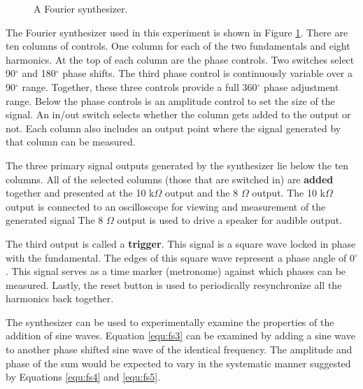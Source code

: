 \begin{figure}
\caption{A Fourier synthesizer.}
\label{fig:fs4}
\end{figure}

The Fourier synthesizer used in this experiment is shown in Figure \ref{fig:fs4}. There are ten columns of controls. One column for each of the two fundamentals and eight harmonics. At the top of each column are the phase controls. Two switches select 90$^{\circ}$ and 180$^{\circ}$ phase shifts. The third phase control is continuously variable over a 90$^{\circ}$ range. Together, these three controls provide a full 360$^{\circ}$ phase adjustment range. Below the phase controls is an amplitude control to set the size of the signal. An in/out switch selects whether the column gets added to the output or not. Each column also includes an output point where the signal generated by that column can be measured.

The three primary signal outputs generated by the synthesizer lie below the ten columns. All of the selected columns (those that are switched in) are {\bf added} together and presented at the 10 k$\Omega$ output and the 8 $\Omega$ output. The 10 k$\Omega$ output is connected to an oscilloscope for viewing and measurement of the generated signal  The 8 $\Omega$ output is used to drive a speaker for audible output.

The third output is called a {\bf trigger}. This signal is a square wave locked in phase with the fundamental. The edges of this square wave represent a phase angle of 0$^{\circ}$. This signal serves as a time marker (metronome) against which phases can be measured. Lastly, the reset button is used to periodically resynchronize all the harmonics back together.

The synthesizer can be used to experimentally examine the properties of the addition of sine waves. Equation \ref{equ:fs3} can be examined by adding a sine wave to another phase shifted sine wave of the identical frequency. The amplitude and phase of the sum would be expected to vary in the systematic manner suggested by Equations \ref{equ:fs4} and \ref{equ:fs5}. 

